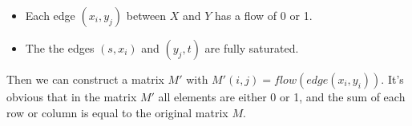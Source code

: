 \begin{itemize}
  \item{Each edge $(x_i, y_j)$ between $X$ and $Y$} has a flow of 0 or 1.
  \item{The the edges $(s, x_i)$ and $(y_j, t)$ are fully saturated}.
\end{itemize}

Then we can construct a matrix $M'$ with $M'(i, j) = flow(edge(x_i, y_i))$. It's obvious that in the matrix $M'$ all elements are either 0 or 1, and the sum of each row or column is equal to the original matrix $M$.